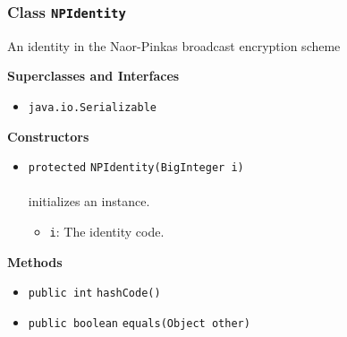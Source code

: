 \subsubsection{Class \lstinline|NPIdentity|}
An identity in the Naor-Pinkas broadcast encryption scheme \\
\noindent\begin{minipage}[t]{5cm}
\vspace{0.3em}
\hspace*{2em}
\vspace{0.3em}
\end{minipage}



\textbf{\sffamily Superclasses and Interfaces}
\begin{itemize}
\item \lstinline|java.io.Serializable|
\end{itemize}


\textbf{\sffamily Constructors}
\begin{itemize}
\item \lstinline|protected| \lstinline|NPIdentity|\lstinline|(BigInteger i)|\\ \\[-0.6em]
initializes an instance.
\begin{itemize}
\item \lstinline|i|: The identity code.
\end{itemize}



\end{itemize}


\textbf{\sffamily Methods}
\begin{itemize}
\item \lstinline|public int| \lstinline|hashCode|\lstinline|()| \\[-0.6em]




\item \lstinline|public boolean| \lstinline|equals|\lstinline|(Object other)| \\[-0.6em]




\end{itemize}

